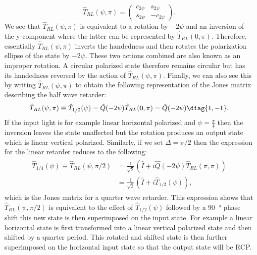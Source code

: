 \begin{equation}
    \hat{T}_{RL}(\psi, \pi)= 
    \begin{pmatrix} 
    c_{2\psi} & s_{2\psi} \\
    s_{2\psi} & -c_{2\psi}
    \end{pmatrix}.
\end{equation}
We see that $\hat{T}_{RL}(\psi, \pi)$ is equivalent to a rotation by $-2\psi$ and an inversion of the y-component where the latter can be represented by $\hat{T}_{RL}(0, \pi)$. Therefore, essentially $\hat{T}_{RL}(\psi, \pi)$ inverts the handedness and then rotates the polarization ellipse of the state by $-2\psi$. These two actions combined are also known as an improper rotation. A circular polarized state therefore remains circular but has its handedness reversed by the action of $\hat{T}_{RL}(\psi, \pi)$. Finally, we can also see this by writing $\hat{T}_{RL}(\psi, \pi)$ to obtain the following representation of the Jones matrix describing the half wave retarder:
\begin{equation}
    \label{eq:l2_wp_effect}
    \hat{T}_{RL}(\psi, \pi)\equiv
    \hat{T}_{1/2}(\psi)=
    \hat{Q}(-2\psi)\hat{T}_{RL}(0, \pi)=\hat{Q}(-2\psi)\diag{1,-1}.
\end{equation}
If the input light is for example linear horizontal polarized and $\psi=\frac{\pi}{4}$ then the inversion leaves the state unaffected but the rotation produces an output state which is linear vertical polarized.
Similarly, if we set $\Delta=\pi/2$ then the expression for the linear retarder reduces to the following:
\begin{align}
\begin{split}
    \hat{T}_{1/4}(\psi)\equiv\hat{T}_{RL}(\psi, \pi/2)
    &=\frac{1}{\sqrt{2}}\left(\hat{I}+i\hat{Q}(-2\psi)\hat{T}_{RL}(\pi, \pi)\right)
    \\
    &=\frac{1}{\sqrt{2}}\left(\hat{I}+i\hat{T}_{1/2}(\psi)\right),
\end{split}
\end{align}
which is the Jones matrix for a quarter wave retarder. This expression shows that $\hat{T}_{RL}(\psi, \pi/2)$ is equivalent to the effect of $\hat{T}_{1/2}(\psi)$ followed by a \SI{90}{\degree} phase shift this new state is then superimposed on the input state. For example a linear horizontal state is first transformed into a linear vertical polarized state and then shifted by a quarter period. This rotated and shifted state is then further superimposed on the horizontal input state so that the output state will be RCP. 

